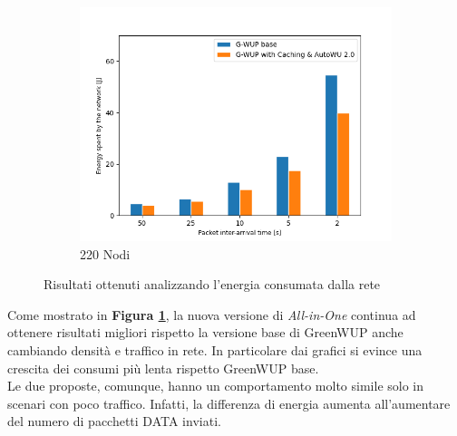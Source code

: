 \begin{figure}[h!]
\begin{subfigure}[t]{0.329\linewidth}
    \includegraphics[width=1.13\linewidth]{Contents/Images/graphs/analisi_final2.0/energySpent/energySpent_220.png}
    \caption{220 Nodi}
  \end{subfigure}
  \caption{Risultati ottenuti analizzando l'energia consumata dalla rete}
  \label{fig:analisi_EnergySpent}
\end{figure}

Come mostrato in \textbf{Figura \ref{fig:analisi_EnergySpent}}, la nuova versione di \textit{All-in-One} continua ad ottenere risultati migliori rispetto la versione base di GreenWUP anche cambiando densità e traffico in rete. In particolare dai grafici si evince una crescita dei consumi più lenta rispetto GreenWUP base.\\
Le due proposte, comunque, hanno un comportamento molto simile solo in scenari con poco traffico. Infatti, la differenza di energia aumenta all'aumentare del numero di pacchetti DATA inviati. 

